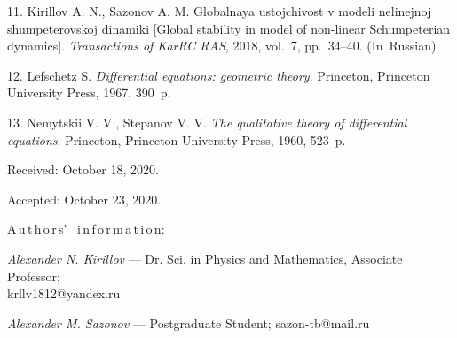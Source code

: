 {11.  Kirillov A. N., Sazonov A. M. Globalnaya ustojchivost v
modeli nelinejnoj shumpeterovskoj dinamiki [Global stability in
model of non-linear Schumpeterian dynamics]. \textit{Transactions
of KarRC RAS}, 2018, vol.~7, pp.~34--40. (In~Russian)

12. Lefschetz S. \textit{Differential equations: geometric
theory}. Princeton, Princeton University Press, 1967, 390~p.

13. Nemytskii V. V., Stepanov V. V. \textit{The qualitative theory
of differential equations}. Princeton, Princeton University Press,
1960, 523~p.



\vskip 1.5mm

%


Received:  October 18, 2020.

Accepted: October 23, 2020.

\vskip 6mm A\,u\,t\,h\,o\,r\,s' \ i\,n\,f\,o\,r\,m\,a\,t\,i\,o\,n:

\vskip 2mm \textit{Alexander N. Kirillov} --- Dr. Sci. in Physics
and Mathematics, Associate Professor; \\
krllv1812@yandex.ru


\vskip 2mm \textit{Alexander M. Sazonov} --- Postgraduate Student;
sazon-tb@mail.ru


}
